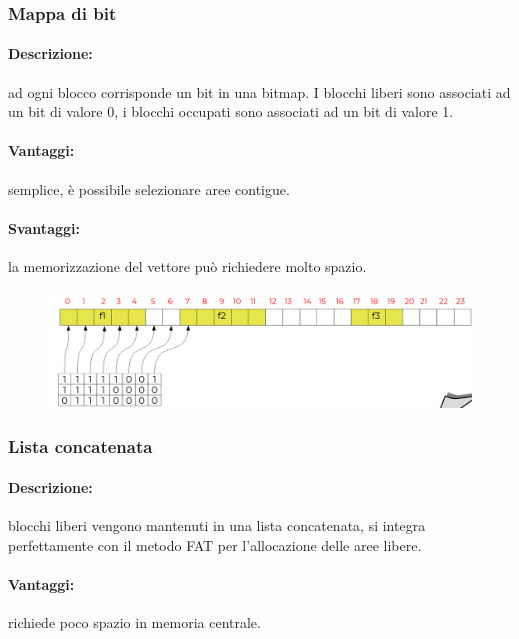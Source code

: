 \subsubsection{Mappa di bit}
\paragraph{Descrizione:} ad ogni blocco corrisponde un bit in una bitmap. I blocchi liberi sono associati ad un bit di valore 0, i blocchi occupati sono associati ad un bit di valore 1.
\paragraph{Vantaggi:} semplice, è possibile selezionare aree contigue.
\paragraph{Svantaggi:} la memorizzazione del vettore può richiedere molto spazio.
\begin{figure} [h]
    \centering
    \includegraphics[width=0.8\linewidth]{Images/Screenshot 2025-01-18 at 16-55-04 so-07-filesystem.pdf.png}
\end{figure}
\newpage
\subsubsection{Lista concatenata}
\paragraph{Descrizione:} blocchi liberi vengono mantenuti in una lista concatenata, si integra perfettamente con il metodo FAT
per l'allocazione delle aree libere.

\paragraph{Vantaggi:} richiede poco spazio in memoria centrale.
